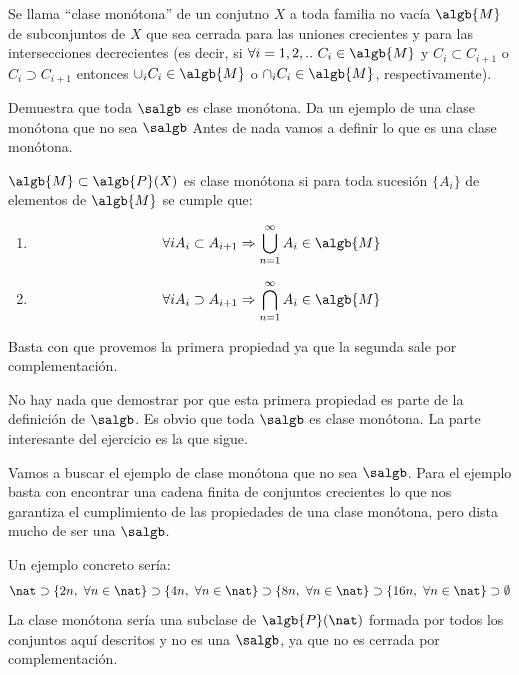 \begin{problem}[13]
Se llama ``clase monótona'' de un conjutno $X$ a toda familia no vacía $\algb{M}$ de subconjuntos de $X$ que sea cerrada para las uniones crecientes y para las intersecciones decrecientes (es decir, si $\forall i=1,2,.. \ C_i \in \algb{M}$ y $C_i \subset C_{i+1}$ o $C_i \supset C_{i+1}$ entonces $\cup_iC_i \in \algb{M}$ o $\cap_iC_i \in \algb{M}$, respectivamente). 

Demuestra que toda $\salgb$ es clase monótona. Da un ejemplo de una clase monótona que no sea $\salgb$
\solution
Antes de nada vamos a definir lo que es una clase monótona.

\begin{defn}
$\algb{M} \subset \algb{P}(X)$ es clase monótona si para toda sucesión $\{A_i\}$ de elementos de $\algb{M}$ se cumple que:
\begin{enumerate}
\item \[\forall i A_i \subset A_{i+1} \Rightarrow \bigcup_{n=1}^{\infty}A_i \in \algb{M}\]
\item \[\forall i A_i \supset A_{i+1} \Rightarrow \bigcap_{n=1}^{\infty}A_i \in \algb{M}\]
\end{enumerate}
\end{defn}
Basta con que provemos la primera propiedad ya que la segunda sale por complementación.

No hay nada que demostrar por que esta primera propiedad es parte de la definición de $\salgb$. Es obvio que toda $\salgb$ es clase monótona. La parte interesante del ejercicio es la que sigue.

Vamos a buscar el ejemplo de clase monótona que no sea $\salgb$.
Para el ejemplo basta con encontrar una cadena finita de conjuntos crecientes lo que nos garantiza el cumplimiento de las propiedades de una clase monótona, pero dista mucho de ser una $\salgb$.

Un ejemplo concreto sería:
\[\nat \supset \{2n, \ \forall n \in \nat\}\supset \{4n, \ \forall n \in \nat\}\supset \{8n, \ \forall n \in \nat\}\supset \{16n, \ \forall n \in \nat\}\supset \emptyset\]
La clase monótona sería una subclase de $\algb{P}(\nat)$ formada por todos los conjuntos aquí descritos y no es una $\salgb$, ya que no es cerrada por complementación.
\end{problem}

